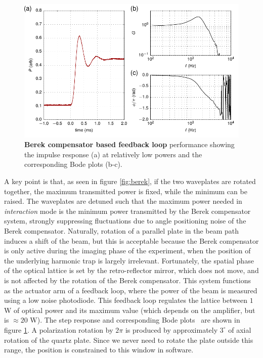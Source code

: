\documentclass[twocolumn,aps,pra,showpacs,preprintnumbers,bibnotes]{revtex4-1}
\begin{document}
\begin{figure}
  \begin{center}
    \includegraphics{fig/step_response.pdf}
    \caption{\textbf{Berek compensator based feedback loop} performance showing the impulse response (a) at relatively low powers and the corresponding Bode plots (b-c).}\label{fig:berek_step_response}
  \end{center}
\end{figure}
A key point is that, as seen in figure \ref{fig:berek}, if the two waveplates are rotated together, the maximum transmitted power is fixed, while the minimum can be raised.
The waveplates are detuned such that the maximum power needed in \textit{interaction} mode is the minimum power transmitted by the Berek compensator system, strongly suppressing fluctuations due to angle positioning noise of the Berek compensator. 
Naturally, rotation of a parallel plate in the beam path induces a shift of the beam, but this is acceptable because the Berek compensator is only active during the imaging phase of the experiment, when the position of the underlying harmonic trap is largely irrelevant.
Fortunately, the spatial phase of the optical lattice is set by the retro-reflector mirror, which does not move, and is not affected by the rotation of the Berek compensator.
This system functions as the actuator arm of a feedback loop, where the power of the beam is measured using a low noise photodiode. This feedback loop regulates the lattice between $1$ W of optical power and its maximum value (which depends on the amplifier, but is $\approx20$ W).
The step response and corresponding Bode plots~\cite{Bechhoefer2005} are shown in figure \ref{fig:berek_step_response}.
A polarization rotation by $2 \pi$ is produced by approximately $3^\circ$ of axial rotation of the quartz plate. 
Since we never need to rotate the plate outside this range, the position is constrained to this window in software.
\end{document}
